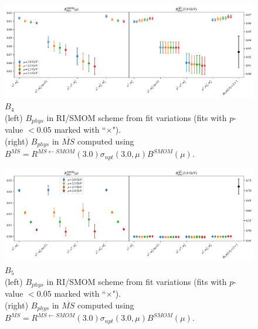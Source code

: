 \documentclass[12pt]{extarticle}
\begin{document}
\clearpage
\begin{figure}
\centering
\includegraphics[page=1, width=1.1\textwidth]{SSpPP/SUSY/fit_summary.pdf}
\caption{$B_{4}$\\(left) $B_{phys}$ in RI/SMOM scheme from fit variations (fits with $p$-value $<0.05$ marked with ``$\times$"). \\(right) $B_{phys}$ in $\overline{MS}$ computed using $B^{\overline{MS}} = R^{\overline{MS}\leftarrow SMOM}(3.0)\sigma_{npt}(3.0,\mu) B^{SMOM}(\mu)$.}
\end{figure}
\clearpage
\begin{figure}
\centering
\includegraphics[page=1, width=1.1\textwidth]{TT/SUSY/fit_summary.pdf}
\caption{$B_{5}$\\(left) $B_{phys}$ in RI/SMOM scheme from fit variations (fits with $p$-value $<0.05$ marked with ``$\times$"). \\(right) $B_{phys}$ in $\overline{MS}$ computed using $B^{\overline{MS}} = R^{\overline{MS}\leftarrow SMOM}(3.0)\sigma_{npt}(3.0,\mu) B^{SMOM}(\mu)$.}
\end{figure}
\clearpage
\end{document}
